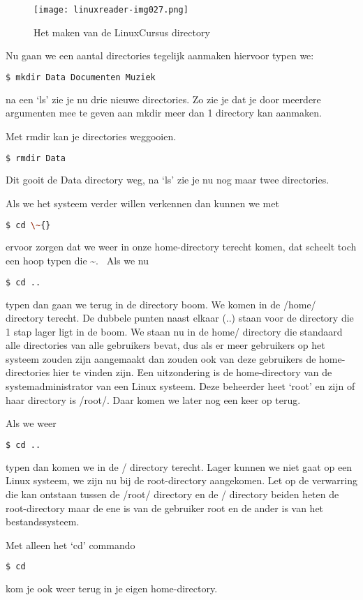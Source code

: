 \begin{figure}
\texttt{[image: linuxreader-img027.png]}
	\label{fig:CreateDirLinuxCursus}
	\caption{Het maken van de LinuxCursus directory}
\end{figure}

Nu gaan we een aantal directories tegelijk aanmaken hiervoor typen we:
\begin{lstlisting}[language=bash]
$ mkdir Data Documenten Muziek
\end{lstlisting}
na een `ls' zie je nu drie nieuwe directories. Zo zie je dat je door meerdere argumenten mee te
geven aan mkdir meer dan 1 directory kan aanmaken.

Met rmdir kan je directories weggooien.
\begin{lstlisting}[language=bash]
$ rmdir Data
\end{lstlisting}
Dit gooit de Data directory weg, na `ls' zie je nu nog maar twee directories.

Als we het systeem verder willen verkennen dan kunnen we met
\begin{lstlisting}[language=bash]
$ cd \~{}
\end{lstlisting}
ervoor zorgen dat we weer in onze home-directory terecht komen, dat scheelt toch een hoop typen die \~{}. \ Als we nu
\begin{lstlisting}[language=bash]
$ cd ..
\end{lstlisting}
typen dan gaan we terug in de directory boom. We komen in de /home/ directory terecht. De dubbele punten naast elkaar
(..) staan voor de directory die 1 stap lager ligt in de boom. We staan nu in de home/ directory die standaard alle
directories van alle gebruikers bevat, dus als er meer gebruikers op het systeem zouden zijn aangemaakt dan zouden ook
van deze gebruikers de home-directories hier te vinden zijn. Een uitzondering is de home-directory van de
systemadministrator van een Linux systeem. Deze beheerder heet `root' en zijn of haar directory is /root/. Daar komen
we later nog een keer op terug.

Als we weer
\begin{lstlisting}[language=bash]
$ cd ..
\end{lstlisting}
typen dan komen we in de / directory terecht. Lager kunnen we niet gaat op een Linux systeem, we zijn nu bij de
root-directory aangekomen. Let op de verwarring die kan ontstaan tussen de /root/ directory en de / directory beiden
heten de root-directory maar de ene is van de gebruiker root en de ander is van het bestandssysteem.

Met alleen het `cd' commando
\begin{lstlisting}[language=bash]
$ cd
\end{lstlisting}
kom je ook weer terug in je eigen home-directory.
